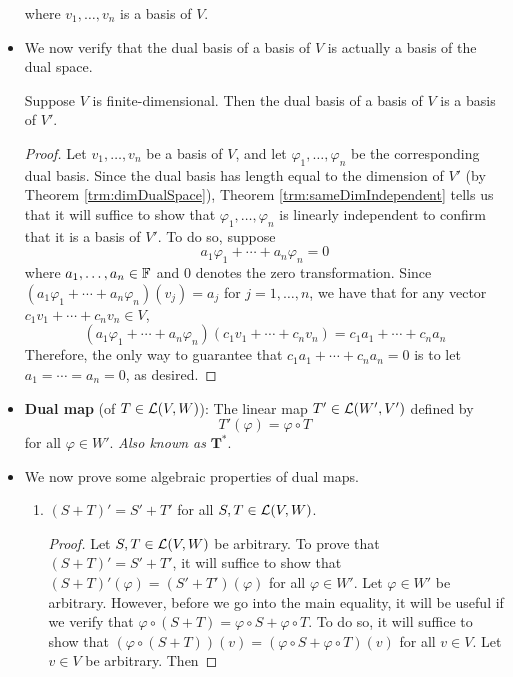 \documentclass[../main.tex]{subfiles}
\begin{document}
\begin{itemize}
    where $v_1,\dots,v_n$ is a basis of $V$.
    \item We now verify that the dual basis of a basis of $V$ is actually a basis of the dual space.
    \begin{theorem}
        Suppose $V$ is finite-dimensional. Then the dual basis of a basis of $V$ is a basis of $V'$.
        \begin{proof}
            Let $v_1,\dots,v_n$ be a basis of $V$, and let $\varphi_1,\dots,\varphi_n$ be the corresponding dual basis. Since the dual basis has length equal to the dimension of $V'$ (by Theorem \ref{trm:dimDualSpace}), Theorem \ref{trm:sameDimIndependent} tells us that it will suffice to show that $\varphi_1,\dots,\varphi_n$ is linearly independent to confirm that it is a basis of $V'$. To do so, suppose
            \begin{equation*}
                a_1\varphi_1+\cdots+a_n\varphi_n = 0
            \end{equation*}
            where $a_1,\dots,a_n\in\mathbb{F}$ and 0 denotes the zero transformation. Since $(a_1\varphi_1+\cdots+a_n\varphi_n)(v_j)=a_j$ for $j=1,\dots,n$, we have that for any vector $c_1v_1+\cdots+c_nv_n\in V$,
            \begin{equation*}
                (a_1\varphi_1+\cdots+a_n\varphi_n)(c_1v_1+\cdots+c_nv_n) = c_1a_1+\cdots+c_na_n
            \end{equation*}
            Therefore, the only way to guarantee that $c_1a_1+\cdots+c_na_n=0$ is to let $a_1=\cdots=a_n=0$, as desired.
        \end{proof}
    \end{theorem}
    \item \textbf{Dual map} (of $T\in\mathcal{L}(V,W)$): The linear map $T'\in\mathcal{L}(W',V')$ defined by
    \begin{equation*}
        T'(\varphi) = \varphi\circ T
    \end{equation*}
    for all $\varphi\in W'$. \emph{Also known as} $\bm{T^*}$.
    \item We now prove some algebraic properties of dual maps.
    \begin{theorem}\leavevmode
        \begin{enumerate}[label={\textup{(}\alph*\textup{)}}]
            \item $(S+T)'=S'+T'$ for all $S,T\in\mathcal{L}(V,W)$.
            \begin{proof}
                Let $S,T\in\mathcal{L}(V,W)$ be arbitrary. To prove that $(S+T)'=S'+T'$, it will suffice to show that $(S+T)'(\varphi)=(S'+T')(\varphi)$ for all $\varphi\in W'$. Let $\varphi\in W'$ be arbitrary. However, before we go into the main equality, it will be useful if we verify that $\varphi\circ(S+T)=\varphi\circ S+\varphi\circ T$. To do so, it will suffice to show that $(\varphi\circ(S+T))(v)=(\varphi\circ S+\varphi\circ T)(v)$ for all $v\in V$. Let $v\in V$ be arbitrary. Then

\end{proof}
\end{enumerate}
\end{theorem}
\end{itemize}
\end{document}
